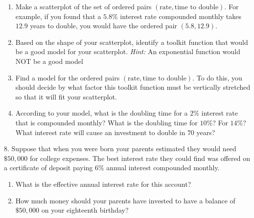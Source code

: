 \documentclass[10pt,]{book}
\theoremstyle{plain}
\theoremstyle{definition}
\theoremstyle{definition}
\theoremstyle{definition}
\numberwithin{equation}{section}
\newlength{\panelmax}
\begin{document}
\begin{exerciselist}
\begin{enumerate}[label=(\alph*)]
{\leavevmode%
\setlength{\tabcolsep}{0\linewidth}
\par\medskip\noindent
\begin{tabular}{@{}*{1}{c}@{}}
\begin{minipage}[c][\panelmax][t]{1\linewidth}\usebox{\panelboxAtabular}\end{minipage}\end{tabular}\\
}%
\item\hypertarget{li-110}{}Make a scatterplot of the set of ordered pairs \((\text{rate}, \text{time to double})\). For example, if you found that a \(5.8\%\) interest rate compounded monthly takes \(12.9\) years to double, you would have the ordered pair \((5.8, 12.9)\).%
\item\hypertarget{li-111}{}Based on the shape of your scatterplot, identify a toolkit function that would be a good model for your scatterplot.  \emph{Hint:} An exponential function would NOT be a good model%
\item\hypertarget{li-112}{}Find a model for the ordered pairs \((\text{rate}, \text{time to double})\). To do this, you should decide by what factor this toolkit function must be vertically stretched so that it will fit your scatterplot.%
\item\hypertarget{li-113}{}According to your model, what is the doubling time for a \(2\%\) interest rate that is compounded monthly?  What is the doubling time for \(10\%\)?  For \(14\%\)? What interest rate will cause an investment to double in \(70\) years?%
\end{enumerate}
\par\smallskip
\item[8.]\hypertarget{exercise-57}{}\hypertarget{p-229}{}%
Suppose that when you were born your parents estimated they would need \(\$50,000\) for college expenses.  The best interest rate they could find was offered on a certificate of deposit paying \(6\%\) annual interest compounded monthly.%
\leavevmode%
\begin{enumerate}[label=(\alph*)]
\item\hypertarget{li-114}{}What is the effective annual interest rate for this account?%
\item\hypertarget{li-115}{}How much money should your parents have invested to have a balance of \(\$50,000\) on your eighteenth birthday?%

\end{enumerate}
\end{exerciselist}
\end{document}
